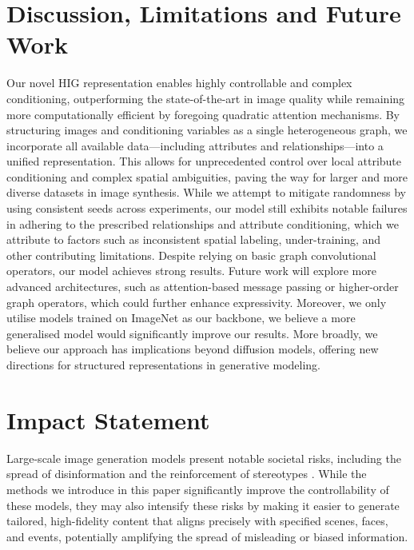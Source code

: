 \section{Discussion, Limitations and Future Work}
\label{sec:discussion}

Our novel HIG representation enables highly controllable and complex conditioning, outperforming the state-of-the-art in image quality while remaining more computationally efficient by foregoing quadratic attention mechanisms. By structuring images and conditioning variables as a single heterogeneous graph, we incorporate all available data—including attributes and relationships—into a unified representation. This allows for unprecedented control over local attribute conditioning and complex spatial ambiguities, paving the way for larger and more diverse datasets in image synthesis. While we attempt to mitigate randomness by using consistent seeds across experiments, our model still exhibits notable failures in adhering to the prescribed relationships and attribute conditioning, which we attribute to factors such as inconsistent spatial labeling, under-training, and other contributing limitations.
Despite relying on basic graph convolutional operators, our model achieves strong results. Future work will explore more advanced architectures, such as attention-based message passing or higher-order graph operators, which could further enhance expressivity. Moreover, we only utilise models trained on ImageNet as our backbone, we believe a more generalised model would significantly improve our results. More broadly, we believe our approach has implications beyond diffusion models, offering new directions for structured representations in generative modeling.

\clearpage
\newpage

\section*{Impact Statement}

Large-scale image generation models present notable societal risks, including the spread of disinformation and the reinforcement of stereotypes \cite{eiras2024risksopportunitiesopensourcegenerative}. While the methods we introduce in this paper significantly improve the controllability of these models, they may also intensify these risks by making it easier to generate tailored, high-fidelity content that aligns precisely with specified scenes, faces, and events, potentially amplifying the spread of misleading or biased information.

